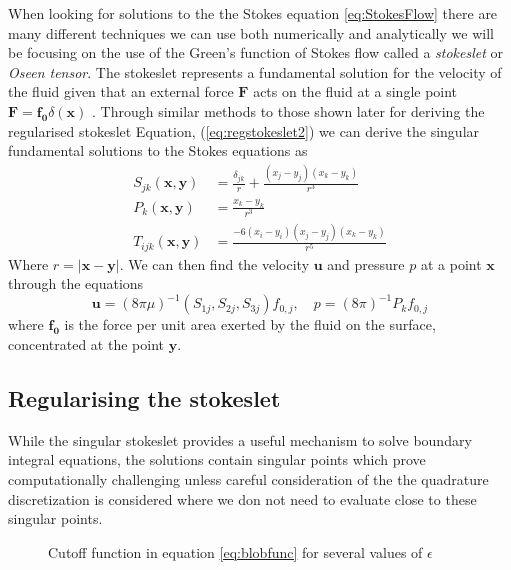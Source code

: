 When looking for solutions to the the Stokes equation \cref{eq:StokesFlow} there are many different techniques we can use both numerically and analytically we will be focusing on the use of the Green's function of Stokes flow called a \textit{stokeslet}\cite{Pozrikidis1992BoundaryFlow,Hancock1953TheLiquids} or \textit{Oseen tensor}\cite{Oseen1927NeuereHydrodynamik}. The stokeslet represents a fundamental solution for the velocity of the fluid given that an external force $\bm{F}$ acts on the fluid at a single point $\bm{F} = \bm{f_0}\delta(\bm{x})$ \cite{Hancock1953TheLiquids, Batchelor2000AnDynamics}.
Through similar methods to those shown later for deriving the regularised stokeslet Equation, (\cref{eq:regstokeslet2}) we can derive the singular fundamental solutions to the Stokes equations as
\begin{equation}
\label{eq:singularsolutions}
\begin{aligned}
    S_{j k}(\bm{x}, \bm{y}) &= \frac{\delta_{j k}}{r}+\frac{\left(x_{j}-y_{j}\right)\left(x_{k}-y_{k}\right)}{r^{3}} \\
    P_{k}(\bm{x}, \bm{y}) &= \frac{x_{k}-y_{k}}{r^{3}} \\
    T_{ijk}(\bm{x}, \bm{y}) &= \frac{-6\left(x_{i}-y_{i}\right)\left(x_{j}-y_{j}\right)\left(x_{k}-y_{k}\right)}{r^5}
\end{aligned}
\end{equation}
Where $r=|\bm{x}-\bm{y}|$. We can then find the velocity $\bm{u}$ and pressure $p$ at a point $\bm{x}$ through the equations
\begin{equation*}
    \bm{u} = (8 \pi \mu)^{-1} \left(S_{1j},S_{2j},S_{3j}\right)f_{0,j}, \quad p = (8 \pi)^{-1} P_k f_{0,j} 
\end{equation*}
where $\bm{f_{0}}$ is the force per unit area exerted by the fluid on the surface, concentrated at the point $\bm{y}$.


\subsection{Regularising the stokeslet}
While the singular stokeslet provides a useful mechanism to solve boundary integral equations, the solutions contain singular points which prove computationally challenging unless careful consideration of the the quadrature discretization is considered where we don not need to evaluate close to these singular points.

\begin{figure}[ht]
    \centering
    \resizebox{.6\linewidth}{!}{}
    \caption{Cutoff function in equation \cref{eq:blobfunc} for several values of $\epsilon$}
    \label{fig:blobfunc}
\end{figure}

